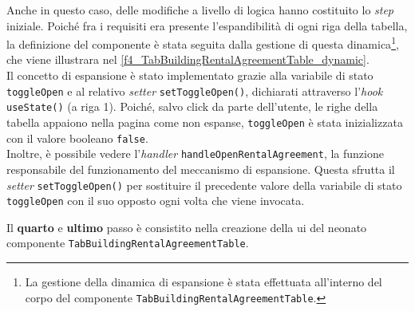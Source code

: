 Anche in questo caso, delle modifiche a livello di logica hanno costituito lo \textit{step} iniziale. Poiché fra i requisiti era presente l'espandibilità di ogni riga della tabella, la definizione del componente è stata seguita dalla gestione di questa dinamica\footnote{La gestione della dinamica di espansione è stata effettuata all'interno del corpo del componente \texttt{TabBuildingRentalAgreementTable}.}, che viene illustrara nel \autoref{f4_TabBuildingRentalAgreementTable_dynamic}.\\
Il concetto di espansione è stato implementato grazie alla variabile di stato \texttt{toggleOpen} e al relativo \textit{setter} \texttt{setToggleOpen()}, dichiarati attraverso l'\textit{hook} \texttt{useState()} (a riga 1). Poiché, salvo click da parte dell'utente, le righe della tabella appaiono nella pagina come non espanse, \texttt{toggleOpen} è stata inizializzata con il valore booleano \texttt{false}.\\
Inoltre, è possibile vedere l'\textit{handler} \texttt{handleOpenRentalAgreement}, la funzione responsabile del funzionamento del meccanismo di espansione. Questa sfrutta il \textit{setter} \texttt{setToggleOpen()} per sostituire il precedente valore della variabile di stato \texttt{toggleOpen} con il suo opposto ogni volta che viene invocata.



Il \textbf{quarto} e \textbf{ultimo} passo è consistito nella creazione della \acrshort{ui} del neonato componente \texttt{TabBuildingRentalAgreementTable}.

